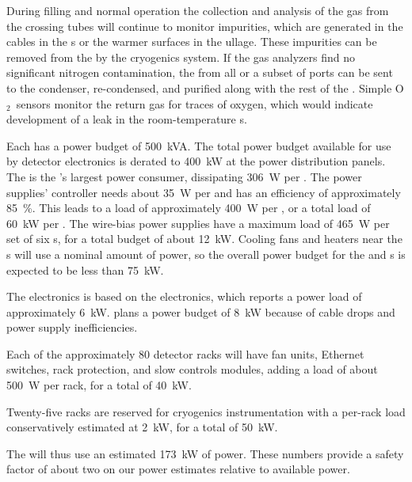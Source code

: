 During filling and normal operation the collection and analysis of the gas from the crossing tubes will continue to %
monitor impurities, which are generated in the cables in the \fdth{}s or the warmer surfaces in the ullage. These impurities can be removed from the  by the cryogenics system.
If the gas analyzers find no significant nitrogen contamination, the  from all or a subset of ports can be sent to the condenser, re-condensed, and purified along with the rest of the . Simple O$_2$\ sensors monitor the return gas for traces of oxygen, which would indicate development of a leak in the room-temperature \fdth{}s.

Each  has a power budget of \SI{500}{kVA}. The total power budget available for use by detector electronics is derated to \SI{400}{kW} at the power distribution panels.  The  is the 's largest power consumer,   
dissipating \SI{306}{W} per .  
The  power supplies' controller needs about \SI{35}{W} per  and has an efficiency of approximately \SI{85}{\%}. This leads to a load of  approximately  \SI{400}{W}  per , or a total load of  \SI{60}{kW} per .  The  wire-bias power supplies have a maximum load of  \SI{465}{W} per set of six s, for a total budget of about   \SI{12}{kW}.   Cooling fans and heaters near the \fdth{}s will use a nominal amount of power, so the overall power budget for the  and  s
is expected to be less than \SI{75}{kW}.


The  electronics is based on the  electronics, which reports a power load of approximately  \SI{6}{kW}.   plans a power budget of  \SI{8}{kW} because of cable drops and  power supply inefficiencies.  

Each of the approximately 80 detector racks will have fan units, Ethernet switches, rack protection, and slow controls modules, adding a load of about \SI{500}{W} per rack, for a total of \SI{40}{kW}.

Twenty-five racks are reserved for cryogenics instrumentation with a per-rack load conservatively estimated at \SI{2}{kW}, for a total of \SI{50}{kW}. 

The  will thus use  an estimated \SI{173}{kW} of power.   These numbers provide a safety factor of about two on our power estimates relative to available power.


